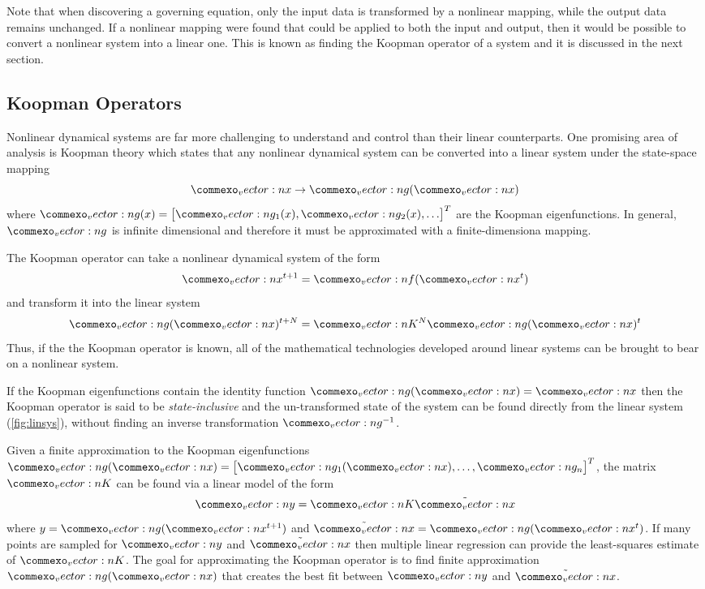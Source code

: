 \documentclass{article}
\renewcommand{\vec}[1]{\vect{#1}}
\newcommand{\mat}[1]{\vect{#1}}
\begin{document}
Note that when discovering a governing equation, only the input data is transformed by a nonlinear mapping, while the output data remains unchanged. If a nonlinear mapping were found that could be applied to both the input and output, then it would be possible to convert a nonlinear system into a linear one. This is known as finding the Koopman operator of a system and it is discussed in the next section.

\subsection{Koopman Operators}
Nonlinear dynamical systems are far more challenging to understand and control than their linear counterparts. One promising area of analysis is Koopman theory \cite{korda2018linear} which states that any nonlinear dynamical system can be converted into a linear system under the state-space mapping
\begin{equation}
\vec{x} \rightarrow \vec{g}(\vec{x})
\end{equation}
where $\vec{g}(x) = \begin{bmatrix} \vec{g}_1(x), \vec{g}_2(x), \ldots \end{bmatrix}^T$ are the Koopman eigenfunctions. In general, $\vec{g}$ is infinite dimensional and therefore it must be approximated with a finite-dimensiona mapping.

The Koopman operator can take a nonlinear dynamical system of the form
\begin{equation}
\vec{x}^{t+1} = \vec{f}(\vec{x}^t)
\end{equation}
and transform it into the linear system
\begin{equation}
\label{fig:linsys}
\vec{g}(\vec{x})^{t+N} = \mat{K}^N \vec{g}(\vec{x})^{t}
\end{equation}
Thus, if the the Koopman operator is known, all of the mathematical technologies developed around linear systems can be brought to bear on a nonlinear system. 

If the Koopman eigenfunctions contain the identity function $\vec{g}(\vec{x}) = \vec{x}$ then the Koopman operator is said to be \emph{state-inclusive} and the un-transformed state of the system can be found directly from the linear system (\cref{fig:linsys}), without finding an inverse transformation $\vec{g}^{-1}$.

Given a finite approximation to the Koopman eigenfunctions $\vec{g}(\vec{x}) = \begin{bmatrix} \vec{g}_1(\vec{x}), \ldots, \vec{g}_n \end{bmatrix}^T$, the matrix $\mat{K}$ can be found via a linear model of the form 
\begin{equation}
\vec{y} = \mat{K} \tilde{\vec{x}}
\end{equation} 
where $y = \vec{g}(\vec{x}^{t+1})$ and $\tilde{\vec{x}} = \vec{g}(\vec{x}^t)$. If many points are sampled for $\vec{y}$ and $\tilde{\vec{x}}$ then multiple linear regression can provide the least-squares estimate of $\mat{K}$. The goal for approximating the Koopman operator is to find finite approximation $\vec{g}(\vec{x})$ that creates the best fit between $\vec{y}$ and $\tilde{\vec{x}}$.
\end{document}
